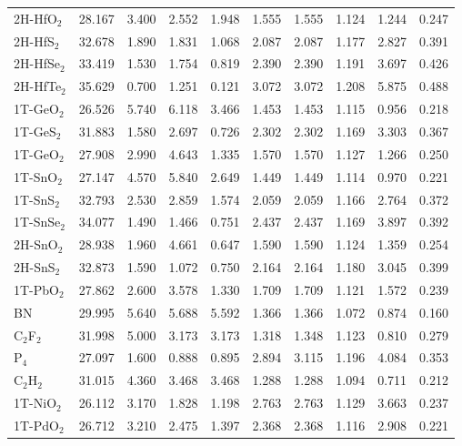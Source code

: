 \begin{center}
\begin{tabularx}{1.1\linewidth}{lXXXXXXXXX}
    2H-HfO$_{2}$ & 28.167  & 3.400  & 2.552  & 1.948  & 1.555  & 1.555  & 1.124  & 1.244  & 0.247 \\
    2H-HfS$_{2}$ & 32.678  & 1.890  & 1.831  & 1.068  & 2.087  & 2.087  & 1.177  & 2.827  & 0.391 \\
    2H-HfSe$_{2}$ & 33.419  & 1.530  & 1.754  & 0.819  & 2.390  & 2.390  & 1.191  & 3.697  & 0.426 \\
    2H-HfTe$_{2}$ & 35.629  & 0.700  & 1.251  & 0.121  & 3.072  & 3.072  & 1.208  & 5.875  & 0.488 \\
    1T-GeO$_{2}$ & 26.526  & 5.740  & 6.118  & 3.466  & 1.453  & 1.453  & 1.115  & 0.956  & 0.218 \\
    1T-GeS$_{2}$ & 31.883  & 1.580  & 2.697  & 0.726  & 2.302  & 2.302  & 1.169  & 3.303  & 0.367 \\
    1T-GeO$_{2}$ & 27.908  & 2.990  & 4.643  & 1.335  & 1.570  & 1.570  & 1.127  & 1.266  & 0.250 \\
    1T-SnO$_{2}$ & 27.147  & 4.570  & 5.840  & 2.649  & 1.449  & 1.449  & 1.114  & 0.970  & 0.221 \\
    1T-SnS$_{2}$ & 32.793  & 2.530  & 2.859  & 1.574  & 2.059  & 2.059  & 1.166  & 2.764  & 0.372 \\
    1T-SnSe$_{2}$ & 34.077  & 1.490  & 1.466  & 0.751  & 2.437  & 2.437  & 1.169  & 3.897  & 0.392 \\
    2H-SnO$_{2}$ & 28.938  & 1.960  & 4.661  & 0.647  & 1.590  & 1.590  & 1.124  & 1.359  & 0.254 \\
    2H-SnS$_{2}$ & 32.873  & 1.590  & 1.072  & 0.750  & 2.164  & 2.164  & 1.180  & 3.045  & 0.399 \\
    1T-PbO$_{2}$ & 27.862  & 2.600  & 3.578  & 1.330  & 1.709  & 1.709  & 1.121  & 1.572  & 0.239 \\
    BN & 29.995  & 5.640  & 5.688  & 5.592  & 1.366  & 1.366  & 1.072  & 0.874  & 0.160 \\
    C$_{2}$F$_{2}$ & 31.998  & 5.000  & 3.173  & 3.173  & 1.318  & 1.348  & 1.123  & 0.810  & 0.279 \\
    P$_{4}$ & 27.097  & 1.600  & 0.888  & 0.895  & 2.894  & 3.115  & 1.196  & 4.084  & 0.353 \\
    C$_{2}$H$_{2}$ & 31.015  & 4.360  & 3.468  & 3.468  & 1.288  & 1.288  & 1.094  & 0.711  & 0.212\\ 
    1T-NiO$_{2}$ & 26.112  & 3.170  & 1.828  & 1.198  & 2.763  & 2.763  & 1.129  & 3.663  & 0.237\\ 
    1T-PdO$_{2}$ & 26.712  & 3.210  & 2.475  & 1.397  & 2.368  & 2.368  & 1.116  & 2.908  & 0.221 \\

\end{tabularx}
\end{center}
